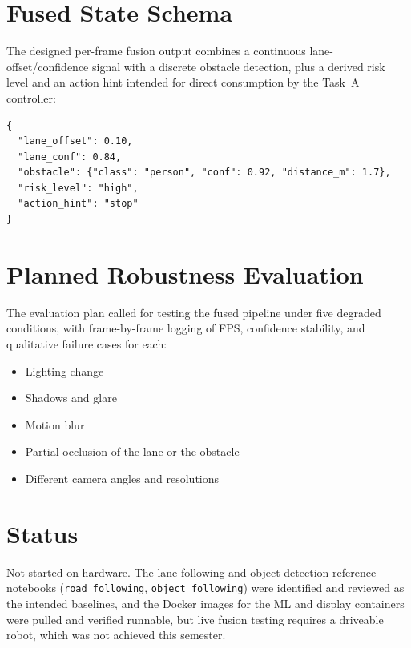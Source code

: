 \documentclass{imc-inf}
\begin{document}
\section{Fused State Schema}
\label{sec:fused-schema}

The designed per-frame fusion output combines a continuous lane-offset/confidence
signal with a discrete obstacle detection, plus a derived risk level and an action
hint intended for direct consumption by the Task~A controller:

\begin{lstlisting}[caption=Fused perception state schema, label=lst:fused-state,language={}]
{
  "lane_offset": 0.10,
  "lane_conf": 0.84,
  "obstacle": {"class": "person", "conf": 0.92, "distance_m": 1.7},
  "risk_level": "high",
  "action_hint": "stop"
}
\end{lstlisting}

\section{Planned Robustness Evaluation}
\label{sec:robustness-evaluation}

The evaluation plan called for testing the fused pipeline under five degraded
conditions, with frame-by-frame logging of FPS, confidence stability, and
qualitative failure cases for each:

\begin{itemize}
\item Lighting change
\item Shadows and glare
\item Motion blur
\item Partial occlusion of the lane or the obstacle
\item Different camera angles and resolutions
\end{itemize}

\section{Status}
\label{sec:task-b-status}

Not started on hardware. The lane-following and object-detection reference
notebooks (\texttt{road\_following}, \texttt{object\_following}) were identified
and reviewed as the intended baselines, and the Docker images for the ML and
display containers were pulled and verified runnable, but live fusion testing
requires a driveable robot, which was not achieved this semester.

\end{document}
